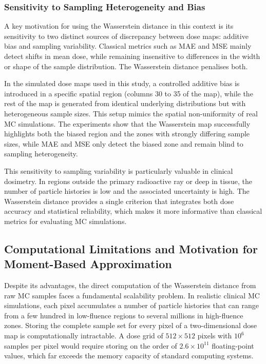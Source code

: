 \documentclass[12pt]{article}
\begin{document}
\subsubsection{Sensitivity to Sampling Heterogeneity and Bias}

A key motivation for using the Wasserstein distance in this context is its sensitivity
to two distinct sources of discrepancy between dose maps: additive bias and sampling
variability. Classical metrics such as MAE and MSE mainly detect shifts in mean dose,
while remaining insensitive to differences in the width or shape of the sample
distribution. The Wasserstein distance penalises both.

In the simulated dose maps used in this study, a controlled additive bias is
introduced in a specific spatial region (columns 30 to 35 of the map), while the
rest of the map is generated from identical underlying distributions but with
heterogeneous sample sizes. This setup mimics the spatial non-uniformity of real MC
simulations. The experiments show that the Wasserstein map successfully highlights
both the biased region and the zones with strongly differing sample sizes, while MAE
and MSE only detect the biased zone and remain blind to sampling heterogeneity.

This sensitivity to sampling variability is particularly valuable in clinical
dosimetry. In regions outside the primary radioactive ray or deep in tissue, the number of
particle histories is low and the associated uncertainty is high. The Wasserstein
distance provides a single criterion that integrates both dose accuracy and
statistical reliability, which makes it more informative than classical metrics for
evaluating MC simulations.

\subsection{Computational Limitations and Motivation for Moment-Based Approximation}

Despite its advantages, the direct computation of the Wasserstein distance from raw
MC samples faces a fundamental scalability problem. In realistic clinical MC
simulations, each pixel accumulates a number of particle histories that can range
from a few hundred in low-fluence regions to several millions in high-fluence zones.
Storing the complete sample set for every pixel of a two-dimensional dose map is
computationally intractable. A dose grid of $512 \times 512$ pixels with $10^6$
samples per pixel would require storing on the order of $2.6 \times 10^{11}$
floating-point values, which far exceeds the memory capacity of standard computing
systems.
\end{document}
